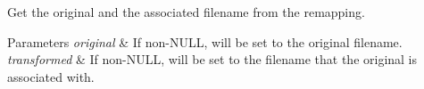 Get the original and the associated filename from the remapping. 


\begin{DoxyParams}{Parameters}
{\em original} & If non-\/\+N\+U\+LL, will be set to the original filename.\\
\hline
{\em transformed} & If non-\/\+N\+U\+LL, will be set to the filename that the original is associated with. \\
\hline
\end{DoxyParams}
